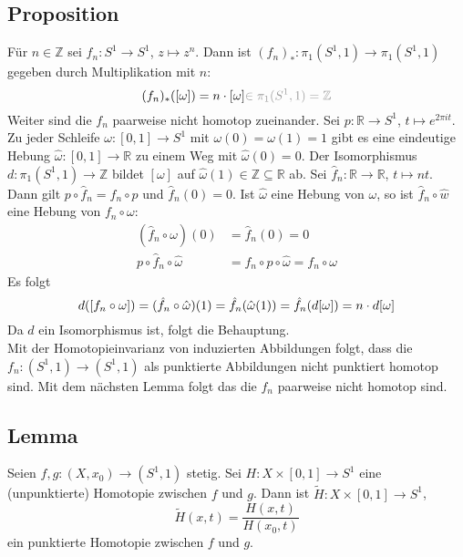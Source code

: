 \subsection[Proposition: Induzierte Abbildung von $f : S^1 \to S^1$, $z	\mapsto z^n$]{Proposition} %
\label{sub:11.9}
Für $n \in \mathds{Z}$ sei $f_n : S^1 \to S^1$, $z \mapsto z^n$. Dann ist $(f_n)_* : \pi_1(S^1, 1) \to \pi_1(S^1,1)$ gegeben durch
Multiplikation mit $n$:
\[
	(f_n)_* ([\omega]) = n \cdot [\omega] {\color{light_gray}\in \pi_1\enbrace{S^1,1} = \mathds{Z}}
\]
Weiter sind die $f_n$ paarweise nicht homotop zueinander.
Sei $p : \mathds{R} \to S^1$, $t \mapsto e^{2 \pi  i t}$. Zu jeder Schleife $\omega : [0,1] \to S^1$ mit $\omega(0)= \omega(1) = 1$ gibt es eine eindeutige Hebung
\(
	\hat{\omega} : [0,1]  \to \mathds{R}
\)
zu einem Weg mit $\hat{\omega}(0)=0$.  Der Isomorphismus $d : \pi_1(S^1,1) \to \mathds{Z}$ bildet $[\omega]$ auf $\hat{\omega}(1) \in \mathds{Z} \subseteq \mathds{R}$ ab.
Sei $\hat{f}_n : \mathds{R} \to \mathds{R}$, $t  \mapsto n t$. Dann gilt $p \circ  \hat{f}_n = f_n \circ p$ und $\hat{f}_n (0)=0$. Ist $\hat{\omega}$ eine Hebung von 
$\omega$, so ist $\hat{f}_n \circ \hat{w}$ eine Hebung von $f_n \circ \omega$: 
\begin{align*}
	(\hat{f}_n \circ  \omega) (0) &= \hat{f}_n (0) = 0 \\
	p \circ  \hat{f}_n \circ  \hat{\omega} &= f_n \circ p \circ  \hat{\omega} = f_n \circ  \omega
\end{align*}
Es folgt 
\[
	d \enbrace*{ [f_n \circ \omega]} = (\hat{f}_n \circ  \hat{\omega}) (1) = \hat{f}_n (\hat{\omega}(1)) = \hat{f}_n (d[\omega]) = n \cdot d[\omega]
\]
Da $d$ ein Isomorphismus ist, folgt die Behauptung. \smallskip \\
Mit der Homotopieinvarianz von induzierten Abbildungen folgt, dass die $f_n : (S^1,1) \to (S^1,1)$ als punktierte Abbildungen nicht punktiert homotop sind. Mit dem nächsten
Lemma folgt das die $f_n$ paarweise nicht homotop sind. \bewende

\subsection[Lemma: Konstruktion einer punktierten Homotopie aus einer nicht punktierten]{Lemma} %
\label{sub:1120}
Seien $f,g : (X,x_0) \to (S^1,1)$ stetig. Sei $H : X \times [0,1] \to S^1$ eine (unpunktierte) Homotopie zwischen $f$ und $g$. Dann ist $\tilde{H} : X \times [0,1]\to S^1$,
\[
	\tilde{H} (x,t) = \frac{H(x,t)}{H(x_0, t)} 
\]
ein punktierte Homotopie zwischen $f$ und $g$.

